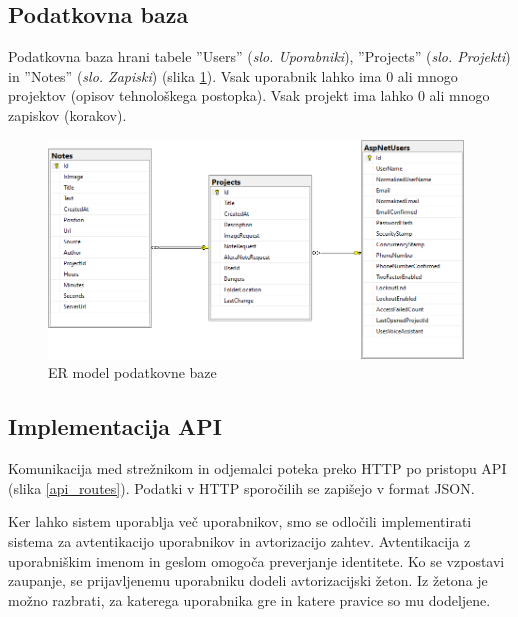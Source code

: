 \documentclass[a4paper, 12pt]{book}
\begin{document}
\subsection{Podatkovna baza}

Podatkovna baza hrani tabele ''Users'' (\textit{slo. Uporabniki}), ''Projects'' (\textit{slo. Projekti}) in ''Notes'' (\textit{slo. Zapiski}) (slika \ref{er_diagram}).
Vsak uporabnik lahko ima 0 ali mnogo projektov (opisov tehnološkega postopka).
Vsak projekt ima lahko 0 ali mnogo zapiskov (korakov).

\begin{figure}[H]
\begin{center}
\includegraphics[width=11cm]{er_diagram_small}
\end{center}
\caption{ER model podatkovne baze}
\label{er_diagram}
\end{figure}




\subsection{Implementacija API}

Komunikacija med strežnikom in odjemalci poteka preko HTTP po pristopu API (slika \ref{api_routes}).
Podatki v HTTP sporočilih se zapišejo v format JSON.

Ker lahko sistem uporablja več uporabnikov, smo se odločili implementirati sistema za avtentikacijo uporabnikov in avtorizacijo zahtev.
Avtentikacija z uporabniškim imenom in geslom omogoča preverjanje identitete.
Ko se vzpostavi zaupanje, se prijavljenemu uporabniku dodeli avtorizacijski žeton.
Iz žetona je možno razbrati, za katerega uporabnika gre in katere pravice so mu dodeljene.
\end{document}
